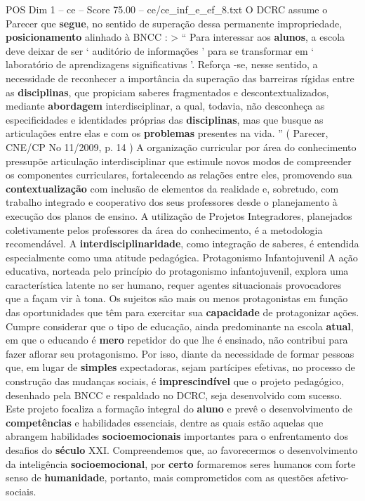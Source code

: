 \begin{textsample}{POS Dim 1 – ce – Score 75.00 – ce/ce\_inf\_e\_ef\_8.txt}
O DCRC assume o Parecer que \textbf{segue}, no sentido de superação dessa permanente impropriedade, \textbf{posicionamento} alinhado à BNCC : > “ Para interessar aos \textbf{alunos}, a escola deve deixar de ser ‘ auditório de informações ’ para se transformar em ‘ laboratório de aprendizagens significativas ’.
Reforça -se, nesse sentido, a necessidade de reconhecer a importância da superação das barreiras rígidas entre as \textbf{disciplinas}, que propiciam saberes fragmentados e descontextualizados, mediante \textbf{abordagem} interdisciplinar, a qual, todavia, não desconheça as especificidades e identidades próprias das \textbf{disciplinas}, mas que busque as articulações entre elas e com os \textbf{problemas} presentes na vida. ” ( Parecer, CNE/CP No 11/2009, p. 14 ) A organização curricular por área do conhecimento pressupõe articulação interdisciplinar que estimule novos modos de compreender os componentes curriculares, fortalecendo as relações entre eles, promovendo sua \textbf{contextualização} com inclusão de elementos da realidade e, sobretudo, com trabalho integrado e cooperativo dos seus professores desde o planejamento à execução dos planos de ensino.
A utilização de Projetos Integradores, planejados coletivamente pelos professores da área do conhecimento, é a metodologia recomendável.
A \textbf{interdisciplinaridade}, como integração de saberes, é entendida especialmente como uma atitude pedagógica.
Protagonismo Infantojuvenil A ação educativa, norteada pelo princípio do protagonismo infantojuvenil, explora uma característica latente no ser humano, requer agentes situacionais provocadores que a façam vir à tona.
Os sujeitos são mais ou menos protagonistas em função das oportunidades que têm para exercitar sua \textbf{capacidade} de protagonizar ações.
Cumpre considerar que o tipo de educação, ainda predominante na escola \textbf{atual}, em que o educando é \textbf{mero} repetidor do que lhe é ensinado, não contribui para fazer aflorar seu protagonismo.
Por isso, diante da necessidade de formar pessoas que, em lugar de \textbf{simples} expectadoras, sejam partícipes efetivas, no processo de construção das mudanças sociais, é \textbf{imprescindível} que o projeto pedagógico, desenhado pela BNCC e respaldado no DCRC, seja desenvolvido com sucesso.
Este projeto focaliza a formação integral do \textbf{aluno} e prevê o desenvolvimento de \textbf{competências} e habilidades essenciais, dentre as quais estão aquelas que abrangem habilidades \textbf{socioemocionais} importantes para o enfrentamento dos desafios do \textbf{século} XXI.
Compreendemos que, ao favorecermos o desenvolvimento da inteligência \textbf{socioemocional}, por \textbf{certo} formaremos seres humanos com forte senso de \textbf{humanidade}, portanto, mais comprometidos com as questões afetivo-sociais.

\end{textsample}
